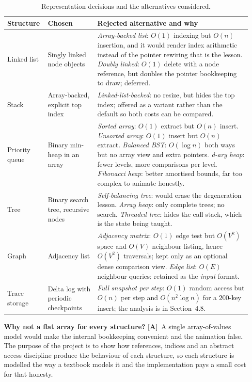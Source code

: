 \documentclass[11pt,a4paper]{article}
\newcommand{\A}{\textcolor{asmc}{\textbf{[A]}}}     %
\begin{document}
\begin{table}[H]
\centering
\small
\setlength{\tabcolsep}{4pt}
\begin{tabular}{@{}L{2.6cm}L{3.6cm}L{8.6cm}@{}}
\toprule
\textbf{Structure} & \textbf{Chosen} & \textbf{Rejected alternative and why} \\
\midrule
Linked list & Singly linked node objects & \emph{Array-backed list}: $O(1)$ indexing but $O(n)$
insertion, and it would render index arithmetic instead of the pointer rewiring that is the
lesson. \emph{Doubly linked}: $O(1)$ delete with a node reference, but doubles the pointer
bookkeeping to draw; deferred. \\
Stack & Array-backed, explicit top index & \emph{Linked-list-backed}: no resize, but hides the
top index; offered as a variant rather than the default so both costs can be compared. \\
Priority queue & Binary min-heap in an array & \emph{Sorted array}: $O(1)$ extract but $O(n)$
insert. \emph{Unsorted array}: $O(1)$ insert but $O(n)$ extract. \emph{Balanced BST}: $O(\log n)$
both ways but no array view and extra pointers. \emph{d-ary heap}: fewer levels, more comparisons
per level. \emph{Fibonacci heap}: better amortised bounds, far too complex to animate honestly. \\
Tree & Binary search tree, recursive nodes & \emph{Self-balancing tree}: would erase the
degeneration lesson. \emph{Array heap}: only complete trees; no search. \emph{Threaded tree}: hides
the call stack, which is the state being taught. \\
Graph & Adjacency list & \emph{Adjacency matrix}: $O(1)$ edge test but $O(V^2)$ space and $O(V)$
neighbour listing, hence $O(V^2)$ traversals; kept only as an optional dense comparison view.
\emph{Edge list}: $O(E)$ neighbour queries; retained as the \emph{input} format. \\
Trace storage & Delta log with periodic checkpoints & \emph{Full snapshot per step}: $O(1)$ random
access but $O(n)$ per step and $O(n^2\log n)$ for a $200$-key insert; the analysis is in
Section~4.8. \\
\bottomrule
\end{tabular}
\caption{Representation decisions and the alternatives considered.}
\end{table}

\noindent\textbf{Why not a flat array for every structure?} \A\ A single array-of-values model would
make the internal bookkeeping convenient and the animation false. The purpose of the project is to
show how references, indices and an abstract access discipline produce the behaviour of each
structure, so each structure is modelled the way a textbook models it and the implementation pays a
small cost for that honesty.
\end{document}
